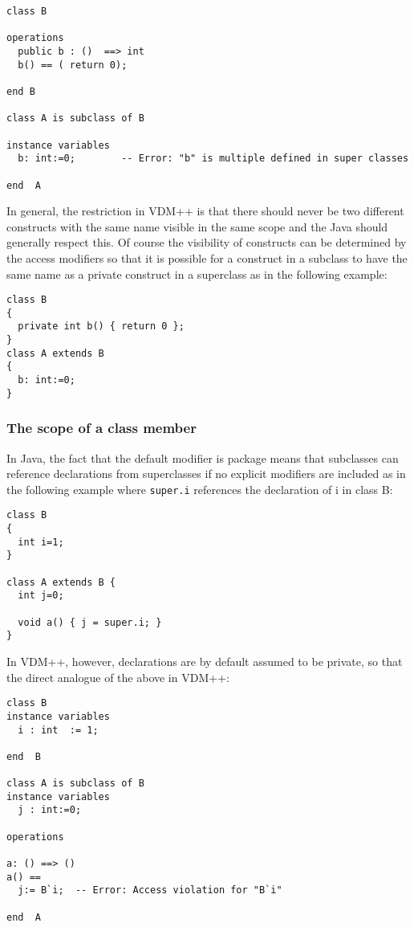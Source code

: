 \documentclass[\pformat,12pt]{article}
\begin{document}
\begin{small}
\begin{verbatim}
class B

operations
  public b : ()  ==> int
  b() == ( return 0);

end B

class A is subclass of B

instance variables
  b: int:=0;        -- Error: "b" is multiple defined in super classes

end  A
\end{verbatim}
\end{small}

In general, the restriction in VDM++ is that there should never be two
different constructs with the same name visible in the same scope and
the Java should generally respect this. Of course the visibility of
constructs can be determined by the access modifiers so that it is
possible for a construct in a subclass to have the same name as a
private construct in a superclass as in the following example:

\begin{small}
\begin{verbatim}
class B
{
  private int b() { return 0 };
}
class A extends B
{ 
  b: int:=0;
}
\end{verbatim}
\end{small}

\subsubsection{The scope of a class member}

In Java, the fact that the default modifier is package means that
subclasses can reference declarations from superclasses if no explicit
modifiers are included as in the following example where
\texttt{super.i} references the declaration of i in class B: 

\begin{small}
\begin{verbatim}
class B
{
  int i=1;
}

class A extends B {
  int j=0;

  void a() { j = super.i; }
}
\end{verbatim}
\end{small}

In VDM++, however, declarations are by default assumed to be private,
so that the direct analogue of the above in VDM++:

\begin{small}
\begin{verbatim}
class B
instance variables 
  i : int  := 1;
  
end  B

class A is subclass of B
instance variables 
  j : int:=0;

operations

a: () ==> ()
a() == 
  j:= B`i;  -- Error: Access violation for "B`i"

end  A
\end{verbatim}
\end{small}
\end{document}
